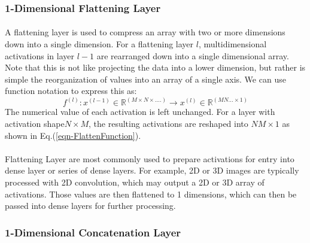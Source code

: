 \documentclass[12pt,letterpaper]{article}
\begin{document}

\subsubsection{1-Dimensional Flattening Layer}
\label{subsubsec-1DFlatten}

\paragraph*{}A flattening layer is used to compress an array with two or more dimensions down into a single dimension. For a flattening layer $l$, multidimensional activations in layer $l-1$ are rearranged down into a single dimensional array. Note that this is not like projecting the data into a lower dimension, but rather is simple the reorganization of values into an array of a single axis. We can use function notation to express this as:
\begin{equation}
\label{eqn-FlattenFunction}
f^{(l)} : x^{(l-1)} \in \mathbb{R}^{(M \times N \times ....)} \rightarrow
x^{(l)} \in \mathbb{R}^{(MN...\times 1)}
\end{equation}
The numerical value of each activation is left unchanged. For a layer with activation shape$N \times M$, the resulting activations are reshaped into $NM \times 1$ as shown in Eq.(\ref{eqn-FlattenFunction}).

\paragraph*{}Flattening Layer are most commonly used to prepare activations for entry into dense layer or series of dense layers. For example, 2D or 3D images are typically processed with 2D convolution, which may output a 2D or 3D array of activations. Those values are then flattened to 1 dimensions, which can then be passed into dense layers for further processing.


\subsubsection{1-Dimensional Concatenation Layer}
\label{subsubsec-1DConcat}
\end{document}
